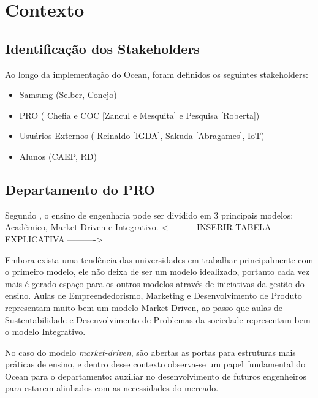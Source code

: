 \chapter{Contexto}
\label{cha:contexto}

\section{Identificação dos Stakeholders}
\label{sec:identificacao_stakeholders}

Ao longo da implementação do Ocean, foram definidos os seguintes stakeholders:

\begin{itemize}
\item Samsung (Selber, Conejo)
\item PRO ( Chefia e COC [Zancul e Mesquita] e Pesquisa [Roberta])
\item Usuários Externos ( Reinaldo [IGDA], Sakuda [Abragames], IoT)
\item Alunos (CAEP, RD)
\end{itemize}

\section{Departamento do PRO}
\label{sec:dep_pro}

Segundo , o ensino de engenharia pode ser dividido em 3 principais modelos: Acadêmico, Market-Driven e Integrativo. <--------- INSERIR TABELA EXPLICATIVA ---------->

Embora exista uma tendência das universidades em trabalhar principalmente com o primeiro modelo, ele não deixa de ser um modelo idealizado, portanto cada vez mais é gerado espaço para os outros modelos através de iniciativas da gestão do ensino. Aulas de Empreendedorismo, Marketing e Desenvolvimento de Produto representam muito bem um modelo Market-Driven, ao passo que aulas de Sustentabilidade e Desenvolvimento de Problemas da sociedade representam bem o modelo Integrativo.

No caso do modelo \textit{market-driven}, são abertas as portas para estruturas mais práticas de ensino, e dentro desse contexto observa-se um papel fundamental do Ocean para o departamento: auxiliar no desenvolvimento de futuros engenheiros para estarem alinhados com as necessidades do mercado. 